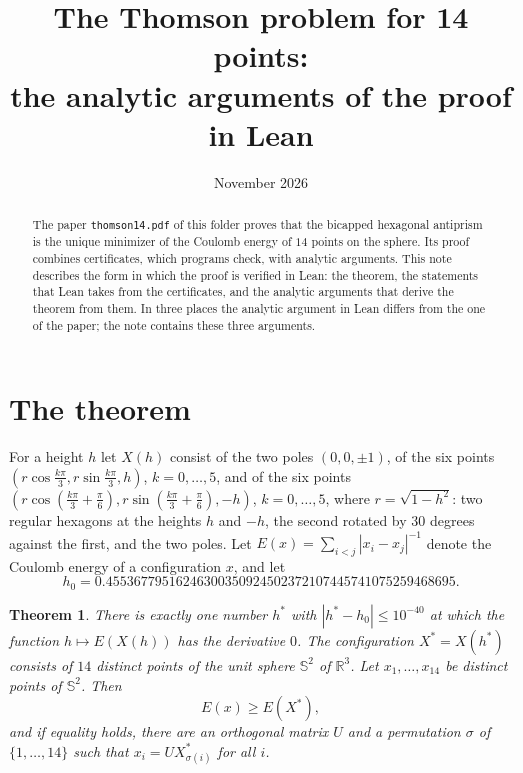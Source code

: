 \documentclass[reqno,a4paper,11pt]{amsart}
\newtheorem{theorem}{Theorem}
\newcommand{\R}{\mathbb{R}}
\newcommand{\Sph}{\mathbb{S}}
\newcommand{\file}[1]{\nolinkurl{#1}}
\begin{document}
\title[The Thomson problem for 14 points: the proof in Lean]{The Thomson problem for 14 points:\\ the analytic arguments of the proof in Lean}

\date{November 2026}

\begin{abstract}
The paper \file{thomson14.pdf} of this folder proves that the bicapped hexagonal antiprism is the unique minimizer of the Coulomb energy of $14$ points on the sphere. Its proof combines certificates, which programs check, with analytic arguments. This note describes the form in which the proof is verified in Lean: the theorem, the statements that Lean takes from the certificates, and the analytic arguments that derive the theorem from them. In three places the analytic argument in Lean differs from the one of the paper; the note contains these three arguments.
\end{abstract}

\maketitle

\section{The theorem}

For a height $h$ let $X(h)$ consist of the two poles $(0,0,\pm 1)$, of the six points
$(r \cos \frac{k\pi}{3}, r \sin \frac{k\pi}{3}, h)$, $k = 0, \dots, 5$, and of the six points
$(r \cos (\frac{k\pi}{3} + \frac{\pi}{6}), r \sin (\frac{k\pi}{3} + \frac{\pi}{6}), -h)$, $k = 0, \dots, 5$, where $r = \sqrt{1 - h^2}$:
two regular hexagons at the heights $h$ and $-h$, the second rotated by $30$ degrees against the first, and the two poles.
Let $E(x) = \sum_{i<j} |x_i - x_j|^{-1}$ denote the Coulomb energy of a configuration $x$, and let
\[
    h_0 = 0.45536779516246300350924502372107445741075259468695 .
\]

\begin{theorem}\label{thm:thomson14}
There is exactly one number $h^*$ with $|h^* - h_0| \leq 10^{-40}$ at which the function $h \mapsto E(X(h))$ has the derivative $0$. The configuration $X^* = X(h^*)$ consists of $14$ distinct points of the unit sphere $\Sph^2$ of $\R^3$. Let $x_1, \dots, x_{14}$ be distinct points of $\Sph^2$. Then
\[
    E(x) \geq E(X^*) ,
\]
and if equality holds, there are an orthogonal matrix $U$ and a permutation $\sigma$ of $\{1, \dots, 14\}$ such that $x_i = U X^*_{\sigma(i)}$ for all $i$.
\end{theorem}
\end{document}
